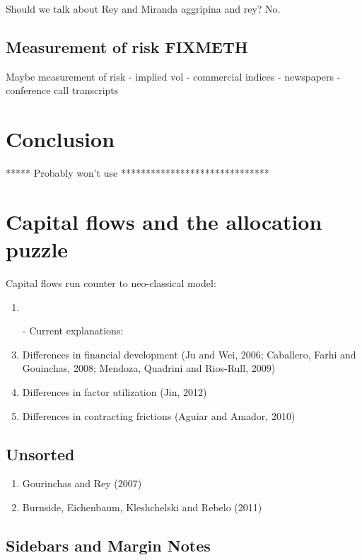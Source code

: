 \documentclass{ar-1col}
\begin{document}
Should we talk about
Rey and Miranda aggripina and rey? No.



\subsection{Measurement of risk FIXMETH}
Maybe measurement of risk - implied vol - commercial indices -
newspapers - conference call transcripts


\section{Conclusion}


***** Probably won't use ******************************


\section*{Capital flows and the allocation puzzle}
Capital flows run counter to neo-classical model:
\begin{enumerate}
\item \citet{GourinchasJeanne2013}
\item[-] Current explanations:
\item Differences in financial development (Ju and Wei, 2006;
  Caballero, Farhi and Gouinchas, 2008; Mendoza, Quadrini and
  Rios-Rull, 2009)
\item Differences in factor utilization (Jin, 2012)
\item Differences in contracting frictions (Aguiar and Amador, 2010)
\end{enumerate}


\subsection{Unsorted}
\begin{enumerate}
\item Gourinchas and Rey (2007)
\item Burnside, Eichenbaum, Kleshchelski and Rebelo (2011)
\end{enumerate}



\subsection{Sidebars and Margin Notes}
\begin{marginnote}[]
    
\end{marginnote}
\end{document}
